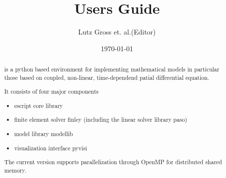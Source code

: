 \documentclass{manual}
\title{\escript Users Guide}
\author{Lutz Gross et. al.(Editor)}
\date{\today}
\begin{document}
\maketitle



\begin{abstract}
\escript is a python based environment for implementing mathematical models in particular those based on coupled, non-linear, time-dependend patial differential equation.

It consists of four major components
\begin{itemize}
\item escript core library
\item finite element solver finley (including the linear solver library paso)
\item model library modellib
\item visualization interface pyvisi
\end{itemize}
The current version supports parallelization through OpenMP for distributed shared memory. 
\end{abstract}

\tableofcontents








% 
%


%

\makemodindex

\printindex
%



\end{document}
